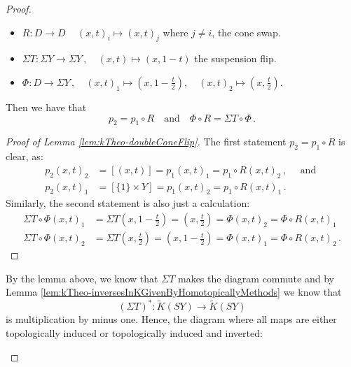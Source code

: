 \begin{proof}
\begin{lemma}
\begin{itemize}
			\item $R:D\to D\,\quad (x,t)_i\mapsto (x,t)_j$ where $j\neq i$, the cone swap.
			\item $\Sigma T: \Sigma Y \to \Sigma Y\,,\quad (x,t)\mapsto (x,1-t)$ the suspension flip.
			\item $\Phi: D\to \Sigma Y\,,\quad (x,t)_1\mapsto (x,1-\frac{t}{2}),\quad (x,t)_2\mapsto (x,\frac{t}{2})$.
		\end{itemize} Then we have that 
		\begin{equation*}
			p_2=p_1\circ R\quad \text{and}\quad \Phi\circ R=\Sigma T\circ \Phi\,.
		\end{equation*}
	\end{lemma}
	\begin{proof}[Proof of Lemma \ref{lem:kTheo-doubleConeFlip}]
		The first statement $p_2=p_1\circ R$ is clear, as:
		\begin{align*}
			p_2(x,t)_2&=[(x,t)]=p_1(x,t)_1=p_1\circ R (x,t)_2\,,\quad \text{ and }\\
			p_2(x,t)_1&=[\{1\} \times Y]=p_1(x,t)_2=p_1 \circ R (x,t)_1\,.
		\end{align*}
Similarly, the second statement is also just a calculation:
\begin{align*}
	\Sigma T\circ \Phi (x,t)_1&=\Sigma T (x,1-\frac{t}{2})=(x,\frac{t}{2})=\Phi(x,t)_2=\Phi \circ R (x,t)_1 \\
	\Sigma T\circ \Phi (x,t)_2&=\Sigma T (x,\frac{t}{2})=(x,1-\frac{t}{2})=\Phi(x,t)_1=\Phi \circ R (x,t)_2\,.
\end{align*}
\end{proof}
By the lemma above, we know that $\Sigma T$ makes the diagram commute and by Lemma \ref{lem:kTheo-inversesInKGivenByHomotopicallyMethods} we know that 
\begin{equation*}
	(\Sigma T)^* :\tilde{K}(SY)\to \tilde{K}(SY)
\end{equation*} is multiplication by minus one. Hence, the diagram where all maps are either topologically induced or topologically induced and inverted:
	\begin{center}
\end{center}
\end{proof}

